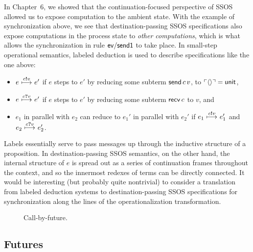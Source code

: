 In Chapter~6, we showed that the continuation-focused perspective of
SSOS allowed us to expose computation to the ambient state. With the
example of synchronization above, we see that destination-passing SSOS
specifications also expose computations in the process state to {\it
  other computations}, which is what allows the synchronization in
rule ${\sf ev/send1}$ to take place. In small-step operational
semantics, labeled deduction is used to describe specifications like
the one above:
\begin{itemize}
\item $e ~{\stackrel{\footnotesize{c{\textbf{!}}v}}{\longmapsto}}~
e'$ if $e$ steps to $e'$ by reducing some subterm ${\sf send}\,c\,v$,
to ${\ulcorner{\langle\rangle}\urcorner} = {\sf unit}$,
\item $e
~{\stackrel{\footnotesize{c{\textbf{?}}v}}{\longmapsto}}~ e'$ if $e$
steps to $e'$ by reducing some subterm ${\sf recv}\,c$ to $v$, and 
\item $e_1$ in parallel with $e_2$ can reduce to $e_1'$
in parallel with $e_2'$ if $e_1
~{\stackrel{\footnotesize{c{\textbf{!}}v}}{\longmapsto}}~ e_1'$ and
$e_2 ~{\stackrel{\footnotesize{c{\textbf{?}}v}}{\longmapsto}}~ e_2'$.
\end{itemize}
Labels essentially serve to pass messages up through the inductive
structure of a proposition.  In destination-passing SSOS semantics, on
the other hand, the internal structure of $e$ is spread out as a
series of continuation frames throughout the context, and so the
innermost redexes of terms can be directly connected. It would be
interesting (but probably quite nontrivial) to consider a translation
from labeled deduction systems to destination-passing SSOS
specifications for synchronization along the lines of the
operationalization transformation.


\begin{figure}
\caption{Call-by-future.}
\label{fig:dest-futures}
\end{figure}

\subsection{Futures}
\label{sec:dest-futures}

